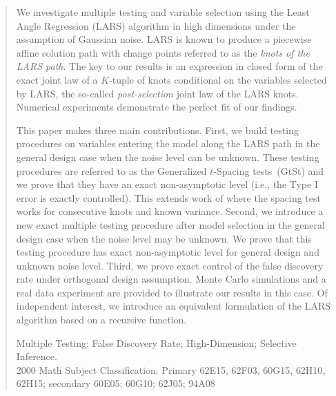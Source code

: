 \documentclass[final,numbib]{imaiai}%
\numberwithin{equation}{section}
\def\\bUnif{\text{\bUnif}}
\newcommand{\<}{\langle}
\renewcommand{\>}{\rangle}
\newcommand{\1}{\mathds{1}}
\begin{document}
\begin{abstract}
{We investigate multiple testing and variable selection using the Least Angle Regression (LARS) algorithm in high dimensions under the assumption of Gaussian noise.
LARS is known to produce a piecewise affine solution path with change points referred to as the {\it knots of the LARS path}. The key to our results is an expression in closed form of the exact joint law of a $K$-tuple of knots conditional on the variables selected by LARS, the so-called {\it post-selection} joint law of the LARS knots. Numerical experiments demonstrate the perfect fit of our findings.

This paper makes three  main contributions.
First, we build testing procedures on variables entering the model along the LARS path in the general design case when the noise level can be unknown.
These testing procedures are referred to as the Generalized $t$-Spacing tests~(GtSt) and we prove that they have an exact non-asymptotic level (i.e., the Type I error is exactly controlled).
This extends work of \cite{taylor2014exact} where the spacing test works for consecutive knots and known variance.
Second, we introduce a new exact multiple testing procedure after model selection in the general design case when the noise level may be unknown.
We prove that this testing procedure has exact non-asymptotic level for general design and unknown noise level.
Third, we prove exact control of the false discovery rate under orthogonal design assumption.
Monte Carlo simulations and a real data experiment are provided to illustrate our results in this case.
Of independent interest, we introduce an equivalent formulation of the LARS algorithm based on a recursive function.}
{{Multiple Testing}; {False Discovery Rate}; {High-Dimension}; {Selective Inference}.}
\\
2000 Math Subject Classification: Primary {62E15}, {62F03}, {60G15}, {62H10}, {62H15}; secondary  {60E05}; {60G10}; {62J05}; {94A08}
\end{abstract}

\end{document}
